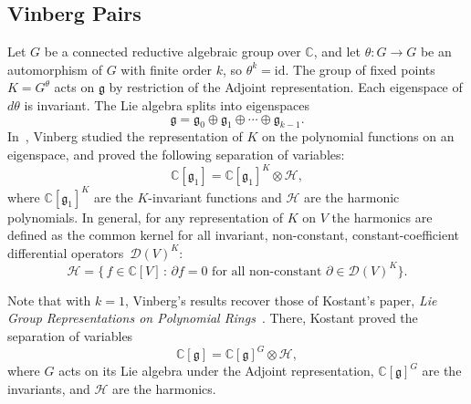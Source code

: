\documentclass[ALCO,Unicode]{cedram}
\newcommand{\C}{\mathbb{C}}
\begin{document}
\subsection{Vinberg Pairs}
Let $G$ be a connected reductive algebraic group over $\C$, and let $\theta:G\to G$ be an automorphism of $G$ with finite order $k$, so $\theta^k = \text{id}$. The group of fixed points $K = G^\theta$ acts on $\mathfrak{g}$ by restriction of the Adjoint representation. Each eigenspace of $d\theta$ is invariant. The Lie algebra splits into eigenspaces
\begin{equation*}
    \mathfrak{g} = \mathfrak{g}_0 \oplus \mathfrak{g}_1 \oplus \cdots \oplus \mathfrak{g}_{k-1}.
\end{equation*}
In~\cite{Vinberg1976}, Vinberg studied the representation of $K$ on the polynomial functions on an eigenspace, and proved the following separation of variables:
\begin{equation*}
    \C[\mathfrak{g}_1] = \C[\mathfrak{g}_1]^K \otimes \mathcal{H},
\end{equation*}
where $\C[\mathfrak{g}_1]^K$ are the $K$-invariant functions and $\mathcal{H}$ are the harmonic polynomials. In general, for any representation of $K$ on $V$ the harmonics are defined as the common kernel for all invariant, non-constant, constant-coefficient differential operators~$\mathcal{D}(V)^K$:
\begin{equation*}
    \mathcal{H} = \{ \, f \in \C[V] \, : \, \partial f = 0 \text{ for all non-constant } \partial \in \mathcal{D}(V)^K \}.
\end{equation*}

Note that with $k=1$, Vinberg's results recover those of Kostant's paper, \textit{Lie Group Representations on Polynomial Rings}~\cite{Kostant1963}. There, Kostant proved the separation of variables
\begin{equation*}
    \C[\mathfrak{g}] = \C[\mathfrak{g}]^G \otimes \mathcal{H},
\end{equation*}
where $G$ acts on its Lie algebra under the Adjoint representation, $\C[\mathfrak{g}]^G$ are the invariants, and $\mathcal{H}$ are the harmonics. 
\end{document}
